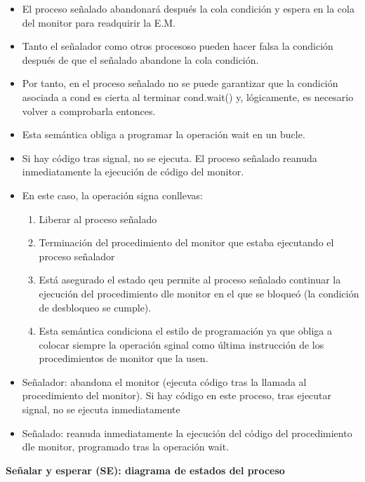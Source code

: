 \documentclass[a4paper,11pt]{article}
\begin{document}
\begin{itemize}
\item El proceso señalado abandonará después la cola condición y espera en la cola del monitor para readquirir la E.M.

\item Tanto el señalador como otros procesoso pueden hacer falsa la condición después de que el señalado abandone la cola condición.

\item Por tanto, en el proceso señalado no se puede garantizar que la condición asociada a cond es cierta al terminar cond.wait() y, lógicamente, es necesario volver a comprobarla entonces.

\item Esta semántica obliga a programar la operación wait en un bucle.

\item Si hay código tras signal, no se ejecuta. El proceso señalado reanuda inmediatamente la ejecución de código del monitor.

\item En este caso, la operación signa conllevas:

	\begin{enumerate}
		\item Liberar al proceso señalado
		\item Terminación del procedimiento del monitor que estaba ejecutando el proceso señalador
		\item Está asegurado el estado qeu permite al proceso señalado continuar la ejecución del procedimiento dle monitor en el que se bloqueó (la condición de desbloqueo se cumple).
		\item Esta semántica condiciona el estilo de programación ya que obliga a colocar siempre la operación sginal como última instrucción de los procedimientos de monitor que la usen.
	\end{enumerate}

\item Señalador: abandona el monitor (ejecuta código tras la llamada al procedimiento del monitor). Si hay código en este proceso, tras ejecutar signal, no se ejecuta inmediatamente

\item Señalado: reanuda inmediatamente la ejecución del código del procedimiento dle monitor, programado tras la operación wait.
\end{itemize}

\textbf{Señalar y esperar (SE): diagrama de estados del proceso}
\end{document}
